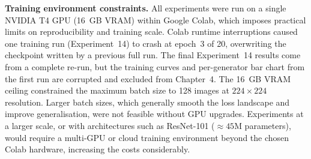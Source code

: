 \textbf{Training environment constraints.} All experiments were run on a single NVIDIA
T4 GPU (16~GB VRAM) within Google Colab, which imposes practical limits on
reproducibility and training scale. Colab runtime interruptions caused one training run
(Experiment~14) to crash at epoch~3 of 20, overwriting the checkpoint written by a
previous full run. The final Experiment~14 results come from a complete re-run, but the
training curves and per-generator bar chart from the first run are corrupted and excluded
from Chapter~4. The 16~GB VRAM ceiling constrained the maximum batch size to 128 images
at $224\times224$ resolution. Larger batch sizes, which generally smooth the loss
landscape and improve generalisation, were not feasible without GPU upgrades. Experiments
at a larger scale, or with architectures such as ResNet-101 (${\approx}45$M parameters),
would require a multi-GPU or cloud training environment beyond the chosen Colab hardware,
increasing the costs considerably.
